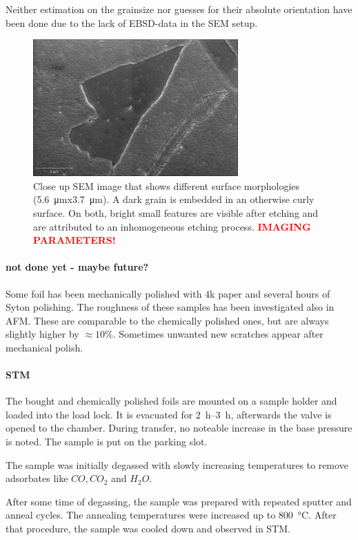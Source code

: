 Neither estimation on the grainsize nor guesses for their absolute orientation have been done due to the lack of EBSD-data in the SEM setup.

\begin{figure}[] \centering
		\includegraphics[width=0.7\textwidth]{./images/Domenik_16031700.jpg}
	\caption{Close up SEM image that shows different surface morphologies (\SI{5.6}{\micro \meter}x\SI{3.7}{\micro \meter}). A dark grain is embedded in an otherwise curly surface. On both, bright small features are visible after etching and are attributed to an inhomogeneous etching process. \textcolor{red}{\textbf{IMAGING PARAMETERS!}}}
	\label{fig:SEM-surface}
\end{figure}



\paragraph{not done yet - maybe future?}
Some foil has been mechanically polished with 4k paper and several hours of Syton polishing. The roughness of these samples has been investigated also in AFM. These are comparable to the chemically polished ones, but are always slightly higher by $\approx 10\%$. Sometimes unwanted new scratches appear after mechanical polish.

\paragraph{STM}
\label{sec:foil-STM}
The bought and chemically polished foils are mounted on a sample holder and loaded into the load lock. It is evacuated for \SIrange{2}{3}{\hour}, afterwards the valve is opened to the chamber. During transfer, no noteable increase in the base pressure is noted. The sample is put on the parking slot.

The sample was initially degassed with slowly increasing temperatures to remove adsorbates like $CO, CO_2$ and $H_2O$.

After some time of degassing, the sample was prepared with repeated sputter and anneal cycles. The annealing temperatures were increased up to \SI{800}{\degreeCelsius}. 
After that procedure, the sample was cooled down and observed in STM.